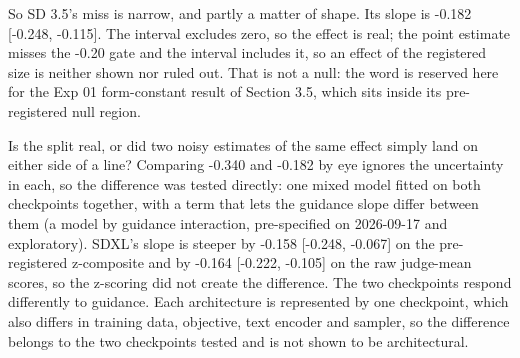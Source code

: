 \documentclass[11pt]{article}
\begin{document}
So SD 3.5's miss is narrow, and partly a matter of shape. Its slope is -0.182
{[}-0.248, -0.115{]}. The interval excludes zero, so the effect is real; the
point estimate misses the -0.20 gate and the interval includes it, so an effect
of the registered size is neither shown nor ruled out. That is not a null: the
word is reserved here for the Exp 01 form-constant result of Section 3.5, which
sits inside its pre-registered null region.

Is the split real, or did two noisy estimates of the same effect simply land on
either side of a line? Comparing -0.340 and -0.182 by eye ignores the
uncertainty in each, so the difference was tested directly: one mixed model
fitted on both checkpoints together, with a term that lets the guidance slope
differ between them (a model by guidance interaction, pre-specified on
2026-09-17 and exploratory). SDXL's slope is steeper by -0.158 {[}-0.248,
-0.067{]} on the pre-registered z-composite and by -0.164 {[}-0.222, -0.105{]}
on the raw judge-mean scores, so the z-scoring did not create the difference.
The two checkpoints respond differently to guidance. Each architecture is
represented by one checkpoint, which also differs in training data, objective,
text encoder and sampler, so the difference belongs to the two checkpoints
tested and is not shown to be architectural.
\end{document}
